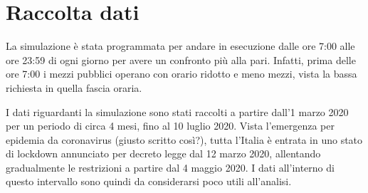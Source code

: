\section{Raccolta dati}

La simulazione è stata programmata per andare in esecuzione dalle ore 7:00 alle ore 23:59 di ogni giorno per avere un confronto più alla pari. Infatti, prima delle ore 7:00 i mezzi pubblici operano con orario ridotto e meno mezzi, vista la bassa richiesta in quella fascia oraria.

I dati riguardanti la simulazione sono stati raccolti a partire dall'1 marzo 2020 per un periodo di circa 4 mesi, fino al 10 luglio 2020. Vista l'emergenza per epidemia da coronavirus (giusto scritto così?), tutta l'Italia è entrata in uno stato di lockdown annunciato per decreto legge dal 12 marzo 2020, allentando gradualmente le restrizioni a partire dal 4 maggio 2020. I dati all'interno di questo intervallo sono quindi da considerarsi poco utili all'analisi.

